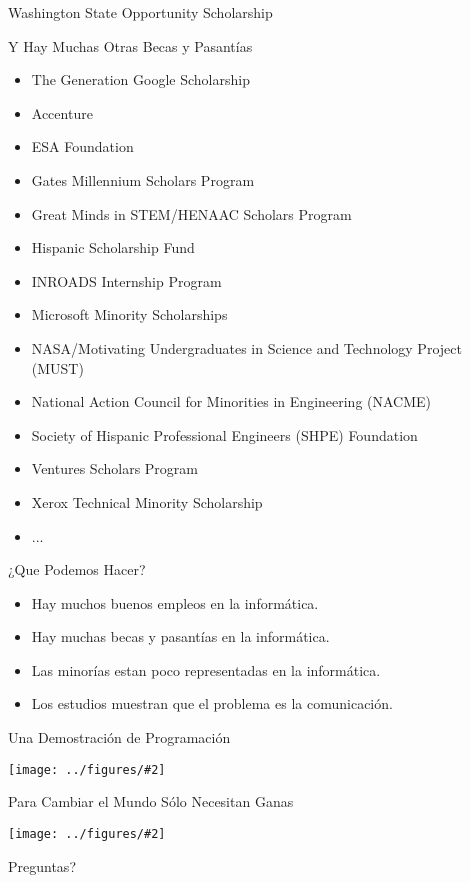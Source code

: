 \documentclass{beamer}
\newcommand{\figpagetall}[1]{
  {
    \usebackgroundtemplate{%
      \parbox[c][\paperheight][c]{\paperwidth}{\centering\texttt{[image: ../figures/\#1]}}
    }
    \begin{frame}[plain]
    \end{frame}
  }
}
\newcommand{\fig}[2]{
  \texttt{[image: ../figures/\#2]}
}
\begin{document}
\begin{centering}
\begin{frame}[fragile]{Washington State Opportunity Scholarship}
\end{frame}
\begin{frame}[fragile]{Y Hay Muchas Otras Becas y Pasantías}


  \begin{itemize}
  \item The Generation Google Scholarship
  \item Accenture
  \item ESA Foundation
  \item Gates Millennium Scholars Program
  \item Great Minds in STEM/HENAAC Scholars Program
  \item Hispanic Scholarship Fund
  \item INROADS Internship Program
  \item Microsoft Minority Scholarships
  \item NASA/Motivating Undergraduates in Science and Technology Project (MUST)
  \item National Action Council for Minorities in Engineering (NACME)
  \item Society of Hispanic Professional Engineers (SHPE) Foundation
  \item Ventures Scholars Program
  \item Xerox Technical Minority Scholarship
  \item ...
  \end{itemize}

  
\end{frame}

\begin{frame}[fragile]{¿Que Podemos Hacer?}

  \begin{itemize}
  \item Hay muchos buenos empleos en la informática.
  \item Hay muchas becas y pasantías en  la informática.
  \item Las minorías estan poco representadas en  la informática.
  \item Los estudios muestran que el problema es la comunicación.
  \end{itemize}

  \vfill\pause


\end{frame}

\begin{frame}[fragile]{Una Demostración de Programación}
  \fig{1.0}{blendershot}
  

\end{frame}


\figpagetall{sammatthewshorseshoer}



\begin{frame}[fragile]{Para Cambiar el Mundo Sólo Necesitan Ganas}
  \fig{1.0}{happycomputing}

  Preguntas?
  
\end{frame}


\end{centering}
\end{document}
